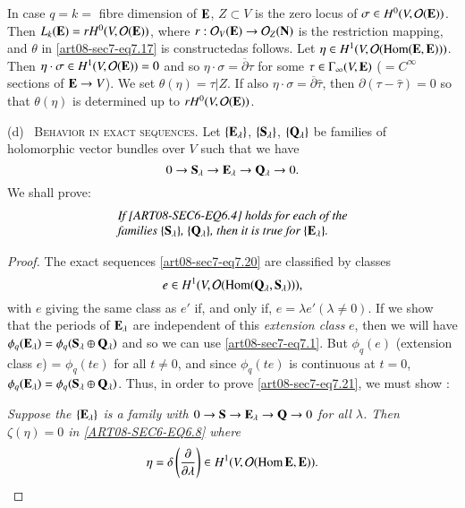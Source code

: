 \begin{remark*}
In case $q=k=$ fibre dimension of $\mathbf{E}$, $Z\subset V$ is the zero locus of $\sigma\in H^{0}(V,\mathcal{O}(\mathbf{E}))$. Then $L_{k}(\mathbf{E})=rH^{0}(V,\mathcal{O}(\mathbf{E}))$, where $r:\mathcal{O}_{V}(\mathbf{E})\to \mathcal{O}_{Z}(\mathbf{N})$ is the restriction mapping, and $\theta$ in \eqref{art08-sec7-eq7.17} is constructed\pageoriginale as follows. Let $\eta\in H^{1}(V,\mathcal{O}(\operatorname{\mathrm{Hom}}(\mathbf{E},\mathbf{E})))$. Then $\eta\cdot \sigma \in H^{1}(V,\mathcal{O}(\mathbf{E}))=0$ and so $\eta\cdot \sigma=\overline{\partial}\tau$ for some $\tau\in \Gamma_{\infty}(V,\mathbf{E})$ ($=C^{\infty}$ sections of $\mathbf{E}\to V$). We set $\theta(\eta)=\tau|Z$. If also $\eta\cdot \sigma=\overline{\partial}\widehat{\tau}$, then $\partial(\tau-\widehat{\tau})=0$ so that $\theta(\eta)$ is determined up to $rH^{0}(V,\mathcal{O}(\mathbf{E}))$.
\end{remark*}

(d)~ \textsc{Behavior in exact sequences.} Let $\{\mathbf{E}_{\lambda}\}$, $\{\mathbf{S}_{\lambda}\}$, $\{\mathbf{Q}_{\lambda}\}$ be families of holomorphic vector bundles over $V$ such that we have 
\begin{equation}
0\to \mathbf{S}_{\lambda} \to \mathbf{E}_{\lambda}\to \mathbf{Q}_{\lambda}\to 0.\label{art08-sec7-eq7.20}
\end{equation}
We shall prove:
\begin{equation}
\begin{array}{l}
\text{\em If \eqref{ART08-SEC6-EQ6.4} holds for each of the}\\
\text{\em families $\{\mathbf{S}_{\lambda}\}$, $\{\mathbf{Q}_{\lambda}\}$, then it is true for $\{\mathbf{E}_{\lambda}\}$.}
\end{array}\label{art08-sec7-eq7.21}
\end{equation}

\begin{proof}
The exact sequences \eqref{art08-sec7-eq7.20} are classified by classes 
$$
e\in H^{1}(V,\mathcal{O}(\operatorname{\mathrm{Hom}}(\mathbf{Q}_{\lambda},\mathbf{S}_{\lambda}))),
$$ 
with $e$ giving the same class as $e'$ if, and only if, $e=\lambda e'(\lambda\neq 0)$. If we show that the periods of $\mathbf{E}_{\lambda}$ are independent of this {\em extension class} $e$, then we will have $\phi_{q}(\mathbf{E}_{\lambda})=\phi_{q}(\mathbf{S}_{\lambda}\oplus \mathbf{Q}_{\lambda})$ and so we can use \eqref{art08-sec7-eq7.1}. But $\phi_{q}(e)$ (extension class $e$) = $\phi_{q}(te)$ for all $t\neq 0$, and since $\phi_{q}(te)$ is continuous at $t=0$, $\phi_{q}(\mathbf{E}_{\lambda})=\phi_{q}(\mathbf{S}_{\lambda}\oplus\mathbf{Q}_{\lambda})$. Thus, in order to prove \eqref{art08-sec7-eq7.21}, we must show :

{\em Suppose the $\{\mathbf{E}_{\lambda}\}$ is a family with $0\to \mathbf{S}\to \mathbf{E}_{\lambda}\to \mathbf{Q}\to 0$ for all $\lambda$. Then $\zeta(\eta)=0$ in \eqref{ART08-SEC6-EQ6.8} where}
\begin{equation}
\eta=\delta \left(\dfrac{\partial}{\partial\lambda}\right)\in H^{1}(V,\mathcal{O}(\operatorname{\mathrm{Hom}} \mathbf{E},\mathbf{E})).\label{art08-sec7-eq7.22}
\end{equation}
\end{proof}


